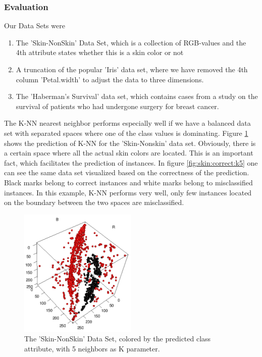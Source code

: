 \documentclass[paper=a4, fontsize=11pt]{scrartcl} %
\numberwithin{equation}{section} %
\numberwithin{figure}{section} %
\numberwithin{table}{section} %
\begin{document}
\subsubsection{Evaluation}
Our Data Sets were 
\begin{enumerate}
\item
    The 'Skin-NonSkin' Data Set, which is a collection of RGB-values and the 4th attribute states whether this is a skin color or not
\item
    A truncation of the popular 'Iris' data set, where we have removed the 4th column 'Petal.width' to adjust the data to three dimensions.
\item
    The 'Haberman's Survival' data set, which contains cases from a study on the survival of patients who had undergone surgery for breast cancer.
\end{enumerate}

The K-NN nearest neighbor performs especially well if we have a balanced data set with separated spaces where one of the class values is dominating. Figure \ref{fig:skin:predicted:k5} shows the prediction of K-NN for the 'Skin-Nonskin' data set. Obviously, there is a certain space where all the actual skin colors are located. This is an important fact, which facilitates the prediction of instances. In figure \ref{fig:skin:correct:k5} one can see the same data set visualized based on the correctness of the prediction. Black marks belong to correct instances and white marks belong to misclassified instances. In this example, K-NN performs very well, only few instances located on the boundary between the two spaces are misclassified.

\begin{figure}[0.5\textwidth]
    \begin{center}
        \includegraphics[width=0.5\textwidth]{Skin_predicted_k5}
    \end{center}
    \caption['Skin-NonSkin' prediction with k=5]{The 'Skin-NonSkin' Data Set, colored by the predicted class attribute, with 5 neighbors as K parameter.}
    \label{fig:skin:predicted:k5}
\end{figure}
\end{document}
